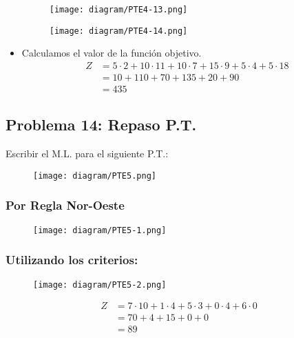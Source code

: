 \documentclass{templateNote}
\begin{document}
\begin{itemize}
    \begin{figure}[H]
        \centering
        \texttt{[image: diagram/PTE4-13.png]}
    \end{figure}

    \begin{figure}[H]
        \centering
        \texttt{[image: diagram/PTE4-14.png]}
    \end{figure}

    \item Calculamos el valor de la función objetivo.
    \begin{align*}
        Z &= 5 \cdot 2 + 10 \cdot 11 + 10 \cdot 7 + 15 \cdot 9 + 5 \cdot 4 + 5 \cdot 18\\
        &= 10 + 110 + 70 + 135 + 20 + 90 \\
        &= 435
    \end{align*}
\end{itemize}

\newpage
\subsection*{Problema 14: Repaso P.T.}
Escribir el M.L. para el siguiente P.T.:
\begin{figure}[H]
    \centering
    \texttt{[image: diagram/PTE5.png]}
\end{figure}

\subsubsection*{Por Regla Nor-Oeste}
\begin{figure}[H]
    \centering
    \texttt{[image: diagram/PTE5-1.png]}
\end{figure}

\subsubsection*{Utilizando los criterios:}
\begin{figure}[H]
    \centering
    \texttt{[image: diagram/PTE5-2.png]}
\end{figure}
\begin{align*}
    Z &= 7 \cdot 10 + 1 \cdot 4 + 5 \cdot 3 + 0 \cdot 4 + 6 \cdot 0 \\
    &= 70 + 4 + 15 + 0 + 0 \\
    &=  89
\end{align*}
\end{document}
